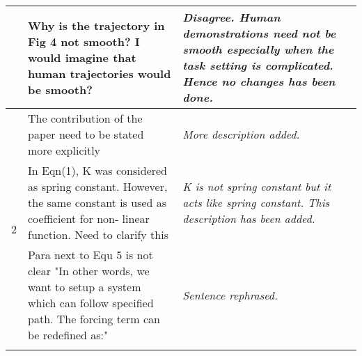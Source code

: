 \documentclass{article}
\begin{document}
\begin{table}
\begin{tabular}{ |c|p{9cm}|p{5cm}| }
		                   & Why is the trajectory in Fig 4 not smooth? I would imagine that human trajectories would be smooth?                                                                                                                                                                                                                                                                                                                        & \textit{Disagree. Human demonstrations need not be smooth especially when the task setting is complicated. Hence no changes has been done.} \\ \hline
		\multirow{7}{*}{2} & The contribution of the paper need to be stated more explicitly                                                                                                                                                                                                                                                                                                                                                            & \textit{More description added.}                                                                                                            \\ \cline{2-3}
		                   & In Eqn(1), K was considered as spring constant. However, the same constant is used as coefficient for non- linear function. Need to clarify this                                                                                                                                                                                                                                                                           & \textit{K is not spring constant but it acts like spring constant. This description has been added.}                                                                                                                          \\ \cline{2-3}
		                   & Para next to Equ 5 is not clear "In other words, we want to setup a system which can follow specified path. The forcing term can be redefined as:"                                                                                                                                                                                                                                                                         & \textit{Sentence rephrased.}                                                                                                                \\ \cline{2-3}

\end{tabular}
\end{table}
\end{document}
